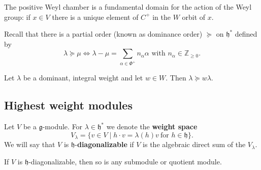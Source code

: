 \documentclass[12pt]{article}
\begin{document}
\begin{proposition}\label{prop:fundamental_domain}
    The positive Weyl chamber is a fundamental domain for the action of the Weyl group:
    if $x \in V$ there is a unique element of $C^+$ in the $W$ orbit of $x$.
\end{proposition}

Recall that there is a partial order (known as dominance order) $\succeq$ on $\mathfrak{h}^*$ defined by
\[
    \lambda \succeq \mu \iff \lambda - \mu = \sum_{\alpha \in \Phi^+} n_\alpha \alpha \text{ with } n_\alpha \in \mathbb{Z}_{\geq 0}.
\]
\begin{proposition}
    Let $\lambda$ be a dominant, integral weight and let $w \in W$. Then $\lambda \succeq w\lambda$.
\end{proposition}

\subsection{Highest weight modules}
Let $V$ be a $\mathfrak{g}$-module. For $\lambda \in \mathfrak{h}^*$ we denote the \textbf{weight space}
\[
    V_\lambda = \{ v \in V \mid h \cdot v = \lambda(h)v \ \text{for } h \in \mathfrak{h} \}.
\]
We will say that $V$ is $\mathfrak{h}$-\textbf{diagonalizable} if $V$ is the algebraic direct sum of the $V_\lambda$.

\begin{proposition}
    If $V$ is $\mathfrak{h}$-diagonalizable, then so is any submodule or quotient module.
\end{proposition}
\end{document}
